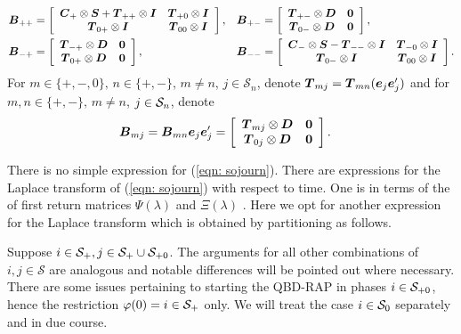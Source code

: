 \begin{align*}
\bs{B}_{++} &= \left[\begin{array}{cc} \bs{C}_+\otimes \bs{S} + \bs{T}_{++}\otimes \bs{I} & \bs T_{+0}\otimes \bs I \\ \bs T_{0+}\otimes \bs I & \bs T_{00}\otimes \bs I\end{array}\right] ,
%
&& \bs{B}_{+-} = \left[\begin{array}{cc} \bs{T}_{+-}\otimes \bs{D} & \bs 0 \\ \bs T_{0-}\otimes \bs D & \bs 0 \end{array}\right],
%
\\ \bs{B}_{-+} &=  \left[\begin{array}{cc} \bs{T}_{-+}\otimes \bs{D} & \bs 0 \\ \bs T_{0+}\otimes \bs D & \bs 0 \end{array}\right] ,
% 
&& \bs{B}_{--} = \left[\begin{array}{cc} \bs{C}_-\otimes \bs{S} - \bs{T}_{--}\otimes \bs{I} & \bs T_{-0}\otimes \bs I \\ \bs T_{0-}\otimes \bs I & \bs T_{00}\otimes \bs I\end{array}\right].
\end{align*}
For \(m\in\{+,-,0\},\,n\in\{+,-\},\,m\neq n\), \(j\in\mathcal S_n\), denote \(\boldsymbol T_{mj} = \boldsymbol T_{mn} (\boldsymbol e_j\boldsymbol e_j')\) and for \(m,n\in\{+,-\},\,m\neq n\), \(j\in\mathcal{S}_n\), denote
\begin{align}
\boldsymbol{B}_{mj} &= \boldsymbol B_{mn} \boldsymbol e_j\boldsymbol e_j'= \left[\begin{array}{cc} \boldsymbol{T}_{mj}\otimes \boldsymbol{D} & \boldsymbol 0 \\ \boldsymbol T_{0j}\otimes \boldsymbol D & \boldsymbol 0 \end{array}\right].
\end{align}

There is no simple expression for (\ref{eqn: sojourn}). There are expressions for the Laplace transform of (\ref{eqn: sojourn}) with respect to time. One is in terms of the of first return matrices \(\Psi(\lambda)\) and \(\Xi(\lambda)\) \citep{bean2009}. Here we opt for another expression for the Laplace transform which is obtained by partitioning as follows.

Suppose \(i\in\mathcal{S}_+,j\in\mathcal S_+\cup\mathcal S_{+0}\). The arguments for all other combinations of \(i,j\in\mathcal S\) are analogous and notable differences will be pointed out where necessary. There are some issues pertaining to starting the QBD-RAP in phases \(i\in\mathcal{S}_{+0}\), hence the restriction \(\varphi(0)=i\in\mathcal{S}_+\) only. We will treat the case \(i\in\mathcal{S}_0\) separately and in due course.

